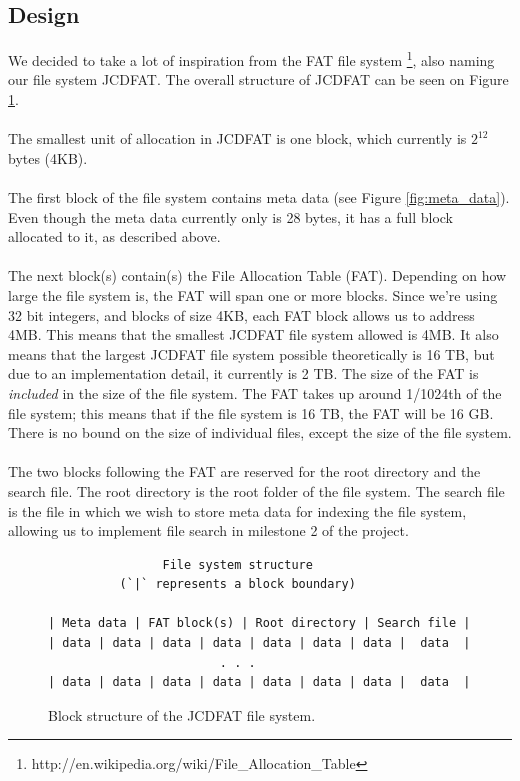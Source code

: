 \documentclass[a4paper,12pt]{article}
\begin{document}
\subsection{Design}
We decided to take a lot of inspiration from the FAT file system
\footnote{http://en.wikipedia.org/wiki/File\_Allocation\_Table}, also naming our file system JCDFAT. The overall structure of JCDFAT can be seen on Figure \ref{fig:block_structure}.\\
\\
The smallest unit of allocation in JCDFAT is one block, which currently is $2^{12}$ bytes (4KB).\\
\\
The first block of the file system contains meta data (see Figure \ref{fig:meta_data}). Even though the meta data currently only is 28 bytes, it has a full block allocated to it, as described above.\\
\\
The next block(s) contain(s) the File Allocation Table (FAT). Depending on how large the file system is, the FAT will span one or more blocks.
Since we're using 32 bit integers, and blocks of size 4KB, each FAT block allows us to address 4MB. This means that the smallest JCDFAT file system allowed is 4MB. It also means that the largest JCDFAT file system possible theoretically is 16 TB, but due to an implementation detail, it currently is 2 TB. The size of the FAT is \emph{included} in the size of the file system. The FAT takes up around 1/1024th of the file system; this means that if the file system is 16 TB, the FAT will be 16 GB.\\
There is no bound on the size of individual files, except the size of the file system.\\
\\
The two blocks following the FAT are reserved for the root directory and the search file. The root directory is the root folder of the file system. The search file is the file in which we wish to store meta data for indexing the file system, allowing us to implement file search in milestone 2 of the project.
\begin{figure}[ht]
    \begin{verbatim}
                File system structure
          (`|` represents a block boundary)

| Meta data | FAT block(s) | Root directory | Search file |
| data | data | data | data | data | data | data |  data  |
                        . . .
| data | data | data | data | data | data | data |  data  |
    \end{verbatim}
    \caption{Block structure of the JCDFAT file system.}
    \label{fig:block_structure}
\end{figure}
\end{document}
